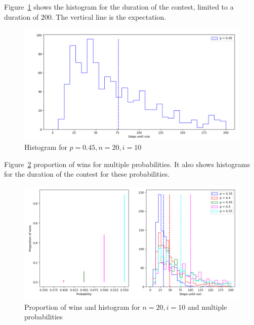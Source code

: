 Figure~\ref{f.gambler-hist1} shows the histogram for the duration of the contest, limited to a duration of $200$. The vertical line is the expectation.
\begin{figure}
\begin{center}
\includegraphics[width=\textwidth]{gamblers_ruin-01}
\end{center}
\caption{Histogram for $p=0.45, n=20, i=10$}\label{f.gambler-hist1}
\end{figure}

Figure~\ref{f.gambler-hist2} proportion of wins for multiple probabilities. It also shows histograms for the duration of the contest for these probabilities. 
\begin{figure}
\begin{center}
\includegraphics[width=\textwidth]{gamblers_ruin-02}
\end{center}
\caption{Proportion of wins and histogram for $n=20, i=10$ and multiple probabilities}\label{f.gambler-hist2}
\end{figure}
